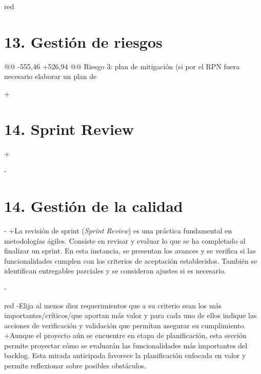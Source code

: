 \documentclass[
 11pt, %
-%
+codirector, %
 ]{charter}
\begin{document}
\begin{table}[ht]
\begin{table}[ht]
\begin{consigna}{red}
 
 \section{13. Gestión de riesgos}
@@ -555,46 +526,94 @@ Riesgo 3: plan de mitigación (si por el RPN fuera necesario elaborar un plan de
 
 \end{consigna}
 
+\section{14. Sprint Review}
+\label{sec:sprint_review}
 
-\section{14. Gestión de la calidad}
-\label{sec:calidad}
+La revisión de sprint (\emph{Sprint Review}) es una práctica fundamental en metodologías ágiles. Consiste en revisar y evaluar lo que se ha completado al finalizar un sprint. En esta instancia, se presentan los avances y se verifica si las funcionalidades cumplen con los criterios de aceptación establecidos. También se identifican entregables parciales y se consideran ajustes si es necesario.
 
-\begin{consigna}{red}
-Elija al menos diez requerimientos que a su criterio sean los más importantes/críticos/que aportan más valor y para cada uno de ellos indique las acciones de verificación y validación que permitan asegurar su cumplimiento.
+Aunque el proyecto aún se encuentre en etapa de planificación, esta sección permite proyectar cómo se evaluarán las funcionalidades más importantes del backlog. Esta mirada anticipada favorece la planificación enfocada en valor y permite reflexionar sobre posibles obstáculos.
 

\end{consigna}
\end{table}
\end{table}
\end{document}
